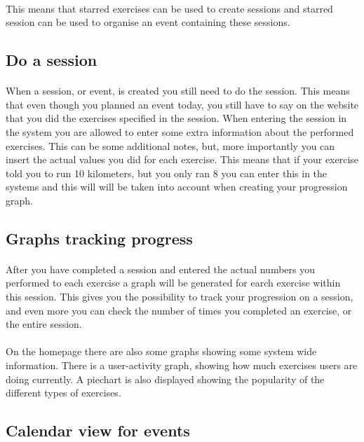 \documentclass[11pt,a4paper]{scrartcl}
\begin{document}
\paragraph{}This means that starred exercises can be used to create sessions and starred session can be used to organise an event containing these sessions.

\subsection{Do a session}
\paragraph{}When a session, or event, is created you still need to do the session. This means that even though you planned an event today, you still have to say on the website that you did the exercises specified in the session. When entering the session in the system you are allowed to enter some extra information about the performed exercises. This can be some additional notes, but, more importantly you can insert the actual values you did for each exercise. This means that if your exercise told you to run 10 kilometers, but you only ran 8 you can enter this in the systems and this will will be taken into account when creating your progression graph.
\subsection{Graphs tracking progress}
\paragraph{}After you have completed a session and entered the actual numbers you performed to each exercise a graph will be generated for earch exercise within this session. This gives you the possibility to track your progression on a session, and even more you can check the number of times you completed an exercise, or the entire session.
\paragraph{}On the homepage there are also some graphs showing some system wide information. There is a user-activity graph, showing how much exercises users are doing currently. A piechart is also displayed showing the popularity of the different types of exercises.
\subsection{Calendar view for events}
\end{document}

